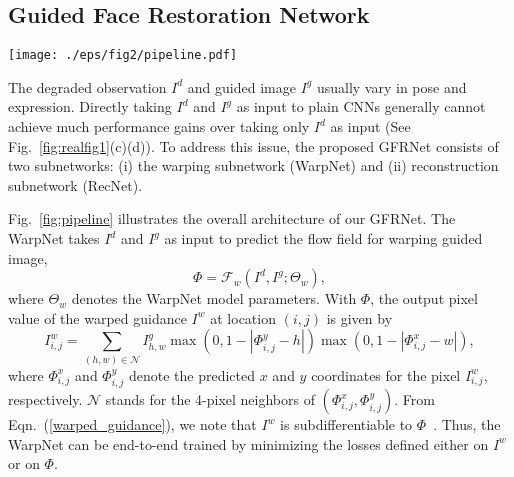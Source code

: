 \documentclass[runningheads]{llncs}
\begin{document}
\subsection{Guided Face Restoration Network}
\begin{figure*}[t]
\setlength{\abovecaptionskip}{-1ex}
\setlength{\belowcaptionskip}{-2ex}
\begin{center}
\texttt{[image: ./eps/fig2/pipeline.pdf]}
\end{center}
   \caption{Overview of our GFRNet. The WarpNet takes the degraded observation $I^d$ and guided image $I^g$ as input to predict the dense flow field $\Phi$, which is adopted to deform $I^g$ to the warped guidance $I^w$. $I^w$ is expected to be spatially well aligned with ground-truth $I$. Thus the RecNet takes $I^w$ and $I^d$ as input to produce the restoration result $\hat{I}$. }
   \label{fig:pipeline}
\end{figure*}
The degraded observation $I^d$ and guided image $I^g$ usually vary in pose and expression.
{Directly} taking $I^d$ and $I^g$ as input to plain CNNs generally cannot achieve much performance gains over taking only $I^d$ as input (See Fig.~\ref{fig:realfig1}(c)(d)).
To address this issue, the proposed GFRNet consists of two subnetworks: (i) the warping subnetwork (WarpNet) and (ii) reconstruction subnetwork (RecNet).

Fig.~\ref{fig:pipeline} illustrates the overall architecture of our GFRNet.
The WarpNet takes $I^d$ and $I^g$ as input to predict the flow field for warping guided image,
\begin{equation}
\label{flow_field}
\Phi = \mathcal{F}_w(I^d, I^g; \Theta_w),
\end{equation}
where $\Theta_w$ denotes the WarpNet model parameters.
With $\Phi$, the output pixel value of the warped guidance $I^{w}$ at location $(i,j)$ is given by
\begin{equation}
\label{warped_guidance}
I^{w}_{i,j} = \sum_{(h,w) \in \mathcal{N}} I^g_{h,w} \max(0, 1 - |\Phi^{y}_{i,j} - h|) \max(0, 1 - |\Phi^{x}_{i,j} - w|),
\end{equation}
where $\Phi^{x}_{i,j}$ and $\Phi^{y}_{i,j}$ denote the predicted $x$ and $y$ coordinates for the pixel $I^{w}_{i,j}$, respectively.
$\mathcal{N}$ stands for the 4-pixel neighbors of $(\Phi^{x}_{i,j}, \Phi^{y}_{i,j})$.
From Eqn.~(\ref{warped_guidance}), we note that $I^{w}$ is subdifferentiable to $\Phi$~\cite{jaderberg2015spatial}.
Thus, the WarpNet can be end-to-end trained by minimizing the losses defined either on $I^{w}$ or on $\Phi$.
\end{document}
